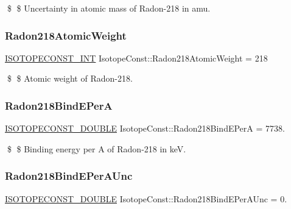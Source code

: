 \$ \$ Uncertainty in atomic mass of Radon-\/218 in amu. \mbox{\label{group___isotope_const-_radon-_rn218_ga9464ed931f5aebf78d261e63a0fc95ce}} 
\subsubsection{\texorpdfstring{Radon218\+Atomic\+Weight}{Radon218AtomicWeight}}
{\footnotesize\ttfamily \mbox{\hyperlink{group___isotope_const-_macros_ga5f18360b3e99483a35c32d789e62621c}{I\+S\+O\+T\+O\+P\+E\+C\+O\+N\+S\+T\+\_\+\+I\+NT}} Isotope\+Const\+::\+Radon218\+Atomic\+Weight = 218}

\$ \$ Atomic weight of Radon-\/218. \mbox{\label{group___isotope_const-_radon-_rn218_ga27dbd2eab6a69a4d9fecd02740134b47}} 
\subsubsection{\texorpdfstring{Radon218\+Bind\+E\+PerA}{Radon218BindEPerA}}
{\footnotesize\ttfamily \mbox{\hyperlink{group___isotope_const-_macros_ga8f45a7272ce02c0b4c65c44636ed719a}{I\+S\+O\+T\+O\+P\+E\+C\+O\+N\+S\+T\+\_\+\+D\+O\+U\+B\+LE}} Isotope\+Const\+::\+Radon218\+Bind\+E\+PerA = 7738.}

\$ \$ Binding energy per A of Radon-\/218 in keV. \mbox{\label{group___isotope_const-_radon-_rn218_gaf9d8748b020204c16b758cce1b606acb}} 
\subsubsection{\texorpdfstring{Radon218\+Bind\+E\+Per\+A\+Unc}{Radon218BindEPerAUnc}}
{\footnotesize\ttfamily \mbox{\hyperlink{group___isotope_const-_macros_ga8f45a7272ce02c0b4c65c44636ed719a}{I\+S\+O\+T\+O\+P\+E\+C\+O\+N\+S\+T\+\_\+\+D\+O\+U\+B\+LE}} Isotope\+Const\+::\+Radon218\+Bind\+E\+Per\+A\+Unc = 0.}

